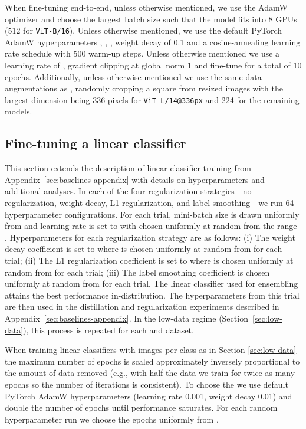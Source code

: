 When fine-tuning end-to-end, unless otherwise mentioned, we use the AdamW optimizer \cite{loshchilov2018decoupled, paszke2019pytorch} and choose the largest batch size such that the model fits into 8 GPUs (512 for \texttt{ViT-B/16}). Unless otherwise mentioned, we use the default PyTorch AdamW hyperparameters , , , weight decay of 0.1 and a cosine-annealing learning rate schedule \cite{loshchilov2016sgdr} with 500 warm-up steps. Unless otherwise mentioned we use a learning rate of , gradient clipping at global norm 1 and fine-tune for a total of 10 epochs. Additionally, unless otherwise mentioned we use the same data augmentations as \cite{radford2021learning}, randomly cropping a square from resized images with the largest dimension being 336 pixels for \texttt{ViT-L/14@336px} and 224 for the remaining models.

\subsection{Fine-tuning a linear classifier}\label{sec:moreclf}

This section extends the description of linear classifier training from Appendix~\ref{sec:baselines-appendix} with details on hyperparameters and additional analyses. In each of the four regularization strategies---no regularization, weight decay, L1 regularization, and label smoothing---we run 64 hyperparameter configurations. For each trial, mini-batch size is drawn uniformly from  and learning rate is set to  with  chosen uniformly at random from the range .
Hyperparameters for each regularization strategy are as follows: (i) The weight decay coefficient is set to  where  is chosen uniformly at random from  for each trial; (ii) The L1 regularization coefficient is set to  where  is chosen uniformly at random from  for each trial; (iii) The label smoothing \cite{muller2019does} coefficient  is chosen uniformly at random from  for each trial. The linear classifier used for ensembling attains the best performance in-distribution. The hyperparameters from this trial are then used in the distillation and regularization experiments described in Appendix~\ref{sec:baselines-appendix}. In the low-data regime (Section~\ref{sec:low-data}), this process is repeated for each  and dataset.





When training linear classifiers with  images per class as in Section \ref{sec:low-data} the maximum number of epochs  is scaled approximately inversely proportional to the amount of data removed (e.g., with half the data we train for twice as many epochs so the number of iterations is consistent). To choose the  we use default PyTorch AdamW hyperparameters (learning rate 0.001, weight decay 0.01) and double the number of epochs until performance saturates. For each random hyperparameter run we choose the epochs uniformly from .

